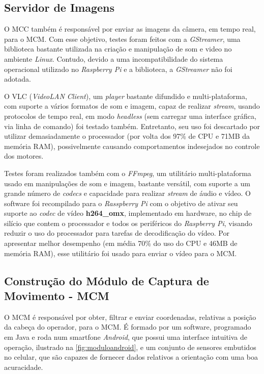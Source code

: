 \subsection{Servidor de Imagens}
\label{subsec:mediaserver}

O MCC também é responsável por enviar as imagens da câmera, em tempo real, para o MCM. Com esse objetivo, testes foram feitos com a \textit{GStreamer}, uma biblioteca bastante utilizada na criação e manipulação de som e video no ambiente \textit{Linux}. Contudo, devido a uma incompatibilidade do sistema operacional utilizado no \textit{Raspberry Pi} e a biblioteca, a \textit{GStreamer} não foi adotada.\par

O VLC (\textit{VideoLAN Client}), um \textit{player} bastante difundido e multi-plataforma, com suporte a vários formatos de som e imagem, capaz de realizar \textit{stream}, usando protocolos de tempo real, em modo \textit{headless} (sem carregar uma interface gráfica, via linha de comando) foi testado também. Entretanto, seu uso foi descartado por utilizar demasiadamente o processador (por volta dos 97\% de CPU e 71MB da memória RAM), possivelmente causando comportamentos indesejados no controle dos motores.\par

Testes foram realizados também com o \textit{FFmpeg}, um utilitário multi-plataforma usado em manipulações de som e imagem, bastante versátil, com suporte a um grande número de \textit{codecs} e capacidade para realizar \textit{stream} de áudio e vídeo. O software foi recompilado para o \textit{Rasspberry Pi} com o objetivo de ativar seu suporte ao \textit{codec} de vídeo \textbf{h264\_omx}, implementado em hardware, no chip de silício que contem o processador e todos os periféricos do \textit{Raspberry Pi}, visando reduzir o uso do processador para tarefas de decodificação do vídeo. Por apresentar melhor desempenho (em média 70\% do uso do CPU e 46MB de memória RAM), esse utilitário foi usado para enviar o vídeo para o MCM.



\subsection{Construção do Módulo de Captura de Movimento - MCM}
\label{subsec:assemmodcapmov}

O MCM é responsável por obter, filtrar e enviar coordenadas, relativas a posição da cabeça do operador, para o MCM. É formado por um software, programado em Java e roda num smartfone \textit{Android}, que possui uma interface intuitiva de operação, ilustrado na \autoref{fig:moduloandroid}, e um conjunto de sensores embutidos no celular, que são capazes de fornecer dados relativos a orientação com uma boa acuracidade. \par

